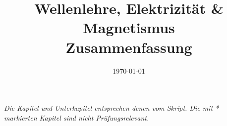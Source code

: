 \documentclass[10pt, a4paper, twocolumn]{article}
\title{Wellenlehre, Elektrizität \& Magnetismus \\ Zusammenfassung}
\date{\today}
\begin{document}
    \maketitle 
    \textit{Die Kapitel und Unterkapitel entsprechen denen vom Skript. Die mit * markierten Kapitel sind nicht Prüfungsrelevant.}
    \thispagestyle{firstpage} 
    
    
    
    
    
    
    
\end{document}
